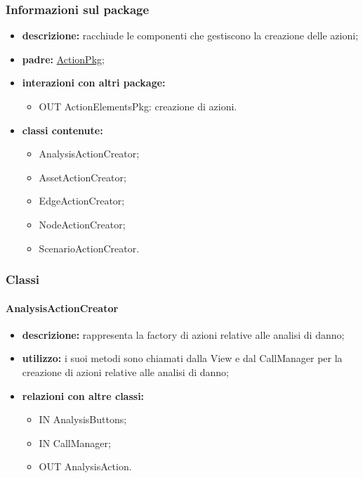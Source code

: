 \subsubsection{Informazioni sul package}
\begin{itemize}
	\item \textbf{descrizione:} racchiude le componenti che gestiscono la creazione delle azioni;
	\item \textbf{padre:} \hyperref[pkg::ActionPkg]{ActionPkg};
	\item \textbf{interazioni con altri package:} 
	\begin{itemize}
		\item OUT ActionElementsPkg: creazione di azioni.
	\end{itemize}
	\item \textbf{classi contenute:}
	\begin{itemize}
		\item AnalysisActionCreator;
		\item AssetActionCreator;
		\item EdgeActionCreator;
		\item NodeActionCreator;
		\item ScenarioActionCreator.
	\end{itemize}
\end{itemize}
\subsubsection{Classi}
\paragraph{AnalysisActionCreator}
\begin{itemize}
	\item \textbf{descrizione:} rappresenta la factory di azioni relative alle analisi di danno;
	\item \textbf{utilizzo:} i suoi metodi sono chiamati dalla View e dal CallManager per la creazione di azioni relative alle analisi di danno;
	\item \textbf{relazioni con altre classi:} 
	\begin{itemize}
		\item IN AnalysisButtons;
		\item IN CallManager;
		\item OUT AnalysisAction.
	\end{itemize}
\end{itemize}
